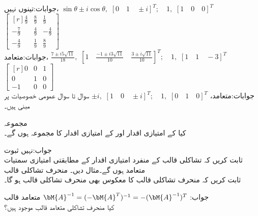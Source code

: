 جوابات:تینوں نہیں، 
$\sin \theta\pm i\cos \theta,\,\,[0\quad 1 \quad \pm i]^T;\quad  1,\,\,[1\quad 0\quad 0]^T$
\quad
$\begin{bmatrix*}[r] \tfrac{4}{9}&\tfrac{8}{9}&\tfrac{1}{9}\\-\tfrac{7}{9}&\tfrac{4}{9}&-\tfrac{4}{9}\\-\tfrac{4}{9}&\tfrac{1}{9}&\tfrac{8}{9} \end{bmatrix*}$\\
جوابات:متعامد، 
$\tfrac{7\pm i5\sqrt{11}}{18},\,\,[1\quad \tfrac{-1\pm i3\sqrt{11}}{10}\quad \tfrac{3\pm i\sqrt{11}}{10}]^T;\quad  1,\,\,[1\quad 1\quad -3]^T$
\quad
$\begin{bmatrix*}[r] 0&0&1\\0&1&0\\ -1&0&0\end{bmatrix*}$\\
جوابات:متعامد، 
$\pm i,\,\,[1\quad 0 \quad \pm i]^T;\quad  1,\,\,[0\quad 1\quad 0]^T$
سوال  تا سوال  عمومی خصوصیات پر مبنی ہیں۔

\quad مجموعہ\\
کیا  کے امتیازی اقدار  اور  کے امتیازی اقدار کا مجموعہ ہوں گے۔

جواب:نہیں
\quad ثبوت\\
ثابت کریں کہ تشاکلی قالب کے منفرد امتیازی اقدار کے مطابقتی امتیازی سمتیات متعامد ہوں گے۔مثال دیں۔
\quad منحرف تشاکلی قالب\\
ثابت کریں کہ منحرف تشاکلی قالب کا معکوس بھی منحرف تشاکلی قالب ہو گا۔

جواب:
$\bM{A}^{-1}=(-\bM{A}^T)^{-1}=-(\bM{A}^{-1})^T$
\quad متعامد قالب\\
کیا  منحرف تشاکلی متعامد قالب موجود ہیں؟

